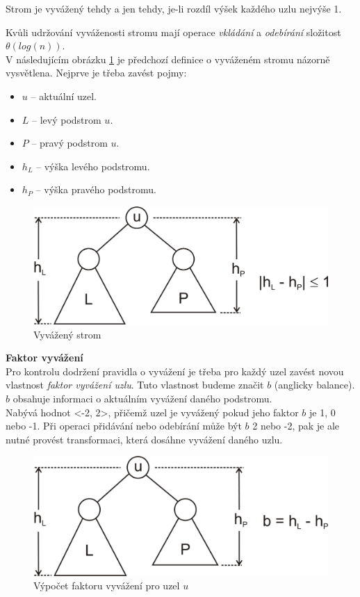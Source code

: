 \documentclass[
  biblatex=false,
  font=serif,
  glossaries=false,
  tables=false,
  theorems=false,
  index
]{kidiplom}
\begin{document}
\begin{definition}
Strom je vyvážený tehdy a jen tehdy, je-li rozdíl výšek každého uzlu nejvýše 1.\cite{Adelson}\cite{dvorsky}
\end{definition}

\noindent Kvůli udržování vyváženosti stromu mají operace \textit{vkládání} a \textit{odebírání} složitost $\theta(log (n))$.\\
\newpage
\noindent V následujícím obrázku \ref{vyvazenyStrom} je předchozí definice o vyváženém stromu názorně vysvětlena. Nejprve je třeba zavést pojmy:
\begin{itemize}
\item $u$ -- aktuální uzel.
\item $L$ -- levý podstrom $u$.
\item $P$ -- pravý podstrom $u$.
\item $h_L$ -- výška levého podstromu.
\item $h_P$ -- výška pravého podstromu.
\end{itemize}

\begin{figure}[h!]
\centering
	\includegraphics[scale=0.3]{obrazky/8AVLVyvazenyStrom.png}
	\caption{Vyvážený strom}
	\label{vyvazenyStrom}
\end{figure}

\noindent\textbf{Faktor vyvážení}\\
\indent Pro kontrolu dodržení pravidla o vyvážení je třeba pro každý uzel zavést novou vlastnost \textit{faktor vyvážení uzlu}. Tuto vlastnost budeme značit $b$ (anglicky balance). $b$ obsahuje informaci o aktuálním vyvážení daného podstromu.\\ 
\indent Nabývá hodnot <-2, 2>, přičemž uzel je vyvážený pokud jeho faktor $b$ je 1, 0 nebo -1. Při operaci přidávání nebo odebírání může být $b$ 2 nebo -2, pak je ale nutné provést transformaci, která dosáhne vyvážení daného uzlu.

\begin{figure}[h!]
\centering
	\includegraphics[scale=0.3]{obrazky/9AVLFaktor.png}
	\caption{Výpočet faktoru vyvážení pro uzel $u$}
\end{figure}
\end{document}
